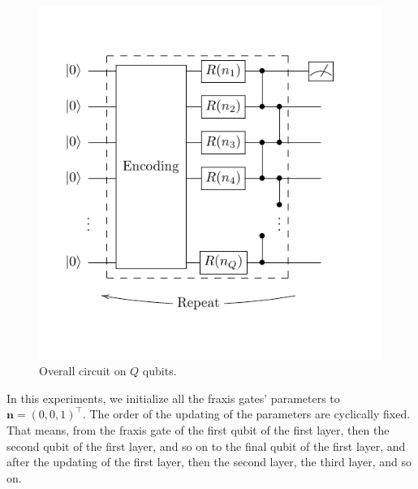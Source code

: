 \begin{figure}[H]
    \centering
    \includegraphics[keepaspectratio, scale=1]{experiment/figure/whole.pdf}
    \caption{Overall circuit on $Q$ qubits.}
    \label{fig:whole}
\end{figure}

\par In this experiments, we initialize all the fraxis gates' parameters to $\bm{n}=(0,0,1)^\top$. The order of the updating of the parameters are cyclically fixed. That means, from the fraxis gate of the first qubit of the first layer, then the second qubit of the first layer, and so on to the final qubit of the first layer, and after the updating of the first layer, then the second layer, the third layer, and so on.